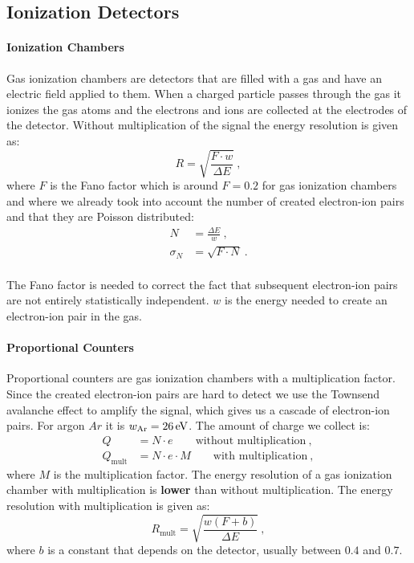 \documentclass[10pt, titlepage, a4paper]{article}
\numberwithin{equation}{section}
\begin{document}
\subsection{Ionization Detectors}
\paragraph{Ionization Chambers}
Gas ionization chambers are detectors that are filled with a gas and have an electric field applied to them. When a charged particle
passes through the gas it ionizes the gas atoms and the electrons and ions are collected at the electrodes of the detector. Without multiplication of the signal 
the energy resolution is given as:
%
\begin{equation}
    R = \sqrt{\frac{F\cdot w}{\Delta E}}\>,
    \label{eq:ionization-res}
\end{equation}
%
where $F$ is the Fano factor which is around $F = 0.2$ for gas ionization chambers and where we already took into account 
the number of created electron-ion pairs and that they are Poisson distributed:
%
\begin{align}
    N &= \frac{\Delta E}{w}\>, \\
    \label{eq:ion-N}
    \sigma_N &= \sqrt{F\cdot N}\>. \\
    \label{eq:ion-sigma} 
\end{align}

The Fano factor is needed to correct the fact that subsequent electron-ion pairs are not entirely statistically 
independent. $w$ is the energy needed to create an electron-ion pair in the gas.

\paragraph{Proportional Counters}
Proportional counters are gas ionization chambers with a multiplication factor.
Since the created electron-ion pairs are hard to detect we use the Townsend avalanche effect to amplify 
the signal, which gives us a cascade of electron-ion pairs. 
For argon $Ar$ it is $w_\text{Ar} = 26\,\rm{eV}$. The amount of charge we collect is:
%
\begin{align}
    Q &= N\cdot e \qquad \text{without multiplication}\>, \\
    Q_\text{mult} &= N\cdot e\cdot M \qquad \text{with multiplication}\>,
    \label{eq:ionization-charge}
\end{align}
%
where $M$ is the multiplication factor. The energy resolution of a gas ionization chamber with multiplication 
is \textbf{lower} than without multiplication. The energy resolution with multiplication is given as:
%
\begin{equation}
    R_\text{mult} = \sqrt{\frac{w\left(F+b\right)}{\Delta E}}\>,
    \label{eq:ionization-res-mult}
\end{equation}
%
where $b$ is a constant that depends on the detector, usually between $0.4$ and $0.7$.
\end{document}
